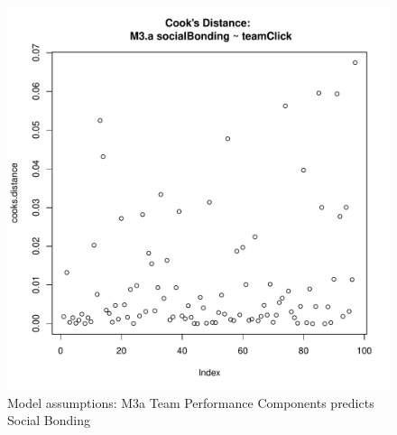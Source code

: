 \begin{figure}[htbp]
        \includegraphics[scale =.4]{images/MLM3aCooksD.pdf}
        \caption{Model assumptions: M3a Team Performance Components predicts Social Bonding}
        \label{fig:MLM3aAssumptions}
      \end{figure}


